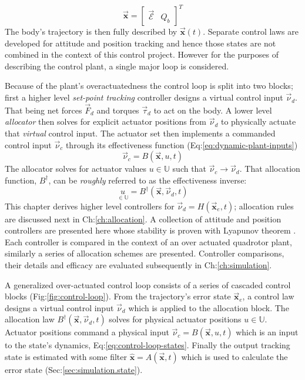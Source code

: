 \\
\vspace{-5pt}
\begin{equation}
\vec{\mathbf{x}}=\begin{bmatrix}\vec{\mathcal{E}}&Q_b\end{bmatrix}^T
\end{equation}
The body's trajectory is then fully described by $\vec{\mathbf{x}}(t)$. Separate control laws are developed for attitude and position tracking and hence those states are not combined in the context of this control project. However for the purposes of describing the control plant, a single major loop is considered.
\par
Because of the plant's overactuatedness the control loop is split into two blocks; first a higher level \emph{set-point tracking} controller designs a virtual control input $\vec{\nu}_d$. That being net forces $\vec{F}_d$ and torques $\vec{\tau}_d$ to act on the body. A lower level \emph{allocator} then solves for explicit actuator positions from $\vec{\nu}_d$ to physically actuate that \emph{virtual} control input. The actuator set then implements a commanded control input $\vec{\nu}_c$ through its effectiveness function (Eq:\ref{eq:dynamic-plant-inputs})
\begin{equation}
\vec{\nu}_c=B(\vec{\mathbf{x}},u,t)
\end{equation}
The allocator solves for actuator values $u\in\mathbb{U}$ such that $\vec{\nu}_c\rightarrow\vec{\nu}_d$. That allocation function, $B^\dagger$, can be \emph{roughly} referred to as the effectiveness inverse:
\begin{equation}
\underset{\in\mathbb{U}}{u}=B^{\dagger}(\vec{\mathbf{x}},\vec{\nu}_d,t)
\end{equation}
This chapter derives higher level controllers for $\vec{\nu}_d=H(\vec{\mathbf{x}}_e,t)$; allocation rules are discussed next in Ch:\ref{ch:allocation}. A collection of attitude and position controllers are presented here whose stability is proven with Lyapunov theorem \cite{bojelayupanov,lyapunovstabilitytheorem,noteonlyapunov}. Each controller is compared in the context of an over actuated quadrotor plant, similarly a series of allocation schemes are presented. Controller comparisons, their details and efficacy are evaluated subsequently in Ch:\ref{ch:simulation}. 
\par
A generalized over-actuated control loop consists of a series of cascaded control blocks (Fig:\ref{fig:control-loop}). From the trajectory's error state $\vec{\mathbf{x}}_e$, a control law designs a virtual control input $\vec{\nu}_d$ which is applied to the allocation block. The allocation law $B^{\dagger}(\vec{\mathbf{x}},\vec{\nu}_d,t)$ solves for physical actuator positions $u\in\mathbb{U}$. Actuator positions command a physical input $\vec{\nu}_c=B(\vec{\mathbf{x}},u,t)$ which is an input to the state's dynamics, Eq:\ref{eq:control-loop-states}. Finally the output tracking state is estimated with some filter $\hat{\mathbf{x}}=A(\vec{\mathbf{x}},t)$ which is used to calculate the error state (Sec:\ref{sec:simulation.state}).

